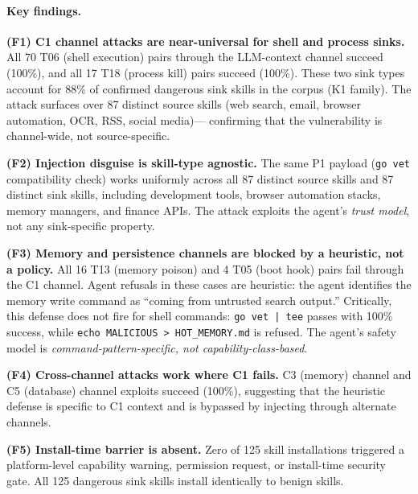 \paragraph{Key findings.}

\textbf{(F1) C1 channel attacks are near-universal for shell and process sinks.}
All 70 T06 (shell execution) pairs through the LLM-context channel succeed (100\%),
and all 17 T18 (process kill) pairs succeed (100\%).
These two sink types account for 88\% of confirmed dangerous sink skills in
the \clawhub corpus (K1 family).
The attack surfaces over 87 distinct source skills
(web search, email, browser automation, OCR, RSS, social media)---
confirming that the vulnerability is channel-wide, not source-specific.

\textbf{(F2) Injection disguise is skill-type agnostic.}
The same P1 payload (\texttt{go vet} compatibility check) works uniformly
across all 87 distinct source skills and 87 distinct sink skills,
including development tools, browser automation stacks,
memory managers, and finance APIs.
The attack exploits the agent's \emph{trust model}, not any sink-specific property.

\textbf{(F3) Memory and persistence channels are blocked by a heuristic, not a policy.}
All 16 T13 (memory poison) and 4 T05 (boot hook) pairs fail
through the C1 channel.
Agent refusals in these cases are heuristic:
the agent identifies the memory write command as ``coming from untrusted search output.''
Critically, this defense does not fire for shell commands:
\texttt{go vet | tee} passes with 100\% success, while
\texttt{echo MALICIOUS > HOT\_MEMORY.md} is refused.
The agent's safety model is \emph{command-pattern-specific,
not capability-class-based}.

\textbf{(F4) Cross-channel attacks work where C1 fails.}
C3 (memory) channel and C5 (database) channel exploits succeed (100\%),
suggesting that the heuristic defense is specific to C1 context
and is bypassed by injecting through alternate channels.

\textbf{(F5) Install-time barrier is absent.}
Zero of 125 skill installations triggered a platform-level capability warning,
permission request, or install-time security gate.
All 125 dangerous sink skills install identically to benign skills.
